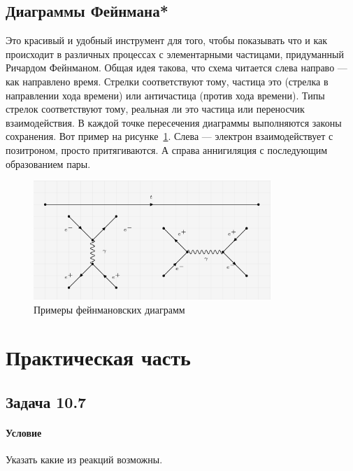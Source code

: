 \documentclass[12pt]{article}
\begin{document}
\subsection*{Диаграммы Фейнмана*}
Это красивый и удобный инструмент для того, чтобы показывать что и как происходит в различных процессах с элементарными частицами, придуманный Ричардом Фейнманом. Общая идея такова, что схема читается слева направо --- как направлено время. Стрелки соответствуют тому, частица это (стрелка в направлении хода времени) или античастица (против хода времени). Типы стрелок соответствуют тому, реальная ли это частица или переносчик взаимодействия. В каждой точке пересечения диаграммы выполняются законы сохранения. Вот пример на рисунке~\ref{fig:sem_11_fey}. Слева --- электрон взаимодействует с позитроном, просто притягиваются. А справа аннигиляция с последующим образованием пары.

\begin{figure}[h]
    \centering
    \includegraphics[width=0.8\textwidth,height=\textheight,keepaspectratio]{Seminar_11-12/pics/pic_05_fey.PNG}
    \caption{Примеры фейнмановских диаграмм}
    \label{fig:sem_11_fey}
\end{figure}

\section{Практическая часть}
\subsection{Задача 10.7}
\label{task_10.7}
\paragraph{Условие}
Указать какие из реакций возможны.
\end{document}
